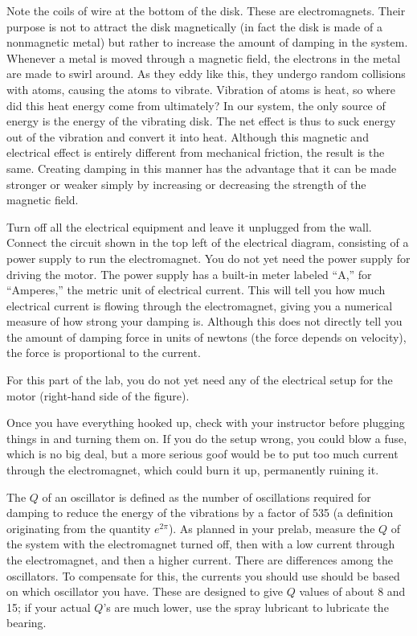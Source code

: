 
Note the coils of wire at the bottom of the disk. These are
electromagnets. Their purpose is not to attract the disk
magnetically (in fact the disk is made of a nonmagnetic
metal) but rather to increase the amount of damping in the
system. Whenever a metal is moved through a magnetic field,
the electrons in the metal are made to swirl around. As they
eddy like this, they undergo random collisions with atoms,
causing the atoms to vibrate. Vibration of atoms is heat, so
where did this heat energy come from ultimately? In our
system, the only source of energy is the energy of the
vibrating disk. The net effect is thus to suck energy out of
the vibration and convert it into heat. Although this
magnetic and electrical effect is entirely different from
mechanical friction, the result is the same. Creating
damping in this manner has the advantage that it can be made
stronger or weaker simply by increasing or decreasing the
strength of the magnetic field.

Turn off all the electrical equipment and leave it
unplugged from the wall. Connect the circuit shown in the top left of the
electrical diagram, consisting of a power supply to run the
electromagnet. You do not yet need the power
supply for driving the motor. The power supply has a built-in meter labeled ``A,'' for ``Amperes,''
the metric
unit of electrical current.
This will tell you how
much electrical current is flowing through the electromagnet,
giving you a numerical measure of how strong your
damping is. Although this does not directly
tell you the amount of damping force in units of newtons
(the force depends on velocity), the force is proportional to the current.

For this part of the lab, you do not yet need any of the electrical setup
for the motor (right-hand side of the figure).

Once you have everything hooked up, check with your
instructor before plugging things in and turning them on. If
you do the setup wrong, you could blow a fuse, which is no
big deal, but a more serious goof would be to put too much
current through the electromagnet, which could burn it up,
permanently ruining it.

The $Q$ of an oscillator is defined as the number of
oscillations required for damping to reduce the energy of
the vibrations by a factor of 535 (a definition originating
from the quantity $e^{2\pi}$). As planned in your prelab,
measure the $Q$ of the system with the electromagnet turned
off, then with a low current through the electromagnet,
and then a higher current. There are differences among the oscillators.
To compensate for this,
the currents you should use should be based on which oscillator you have. 
These are designed to give $Q$ values of about 8 and 15; if your actual
$Q$'s are much lower, use the spray lubricant to lubricate the bearing.

